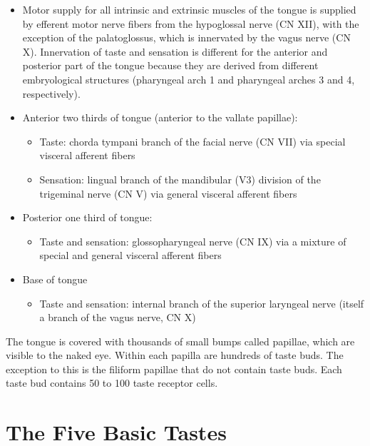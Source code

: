 \documentclass[]{book}
\providecommand{\tightlist}{%
  \setlength{\itemsep}{0pt}\setlength{\parskip}{0pt}}
\begin{document}
\begin{itemize}
\item
  Motor supply for all intrinsic and extrinsic muscles of the tongue is supplied by efferent motor nerve fibers from the hypoglossal nerve (CN XII), with the exception of the palatoglossus, which is innervated by the vagus nerve (CN X).
  Innervation of taste and sensation is different for the anterior and posterior part of the tongue because they are derived from different embryological structures (pharyngeal arch 1 and pharyngeal arches 3 and 4, respectively).
\item
  Anterior two thirds of tongue (anterior to the vallate papillae):

  \begin{itemize}
  \tightlist
  \item
    Taste: chorda tympani branch of the facial nerve (CN VII) via special visceral afferent fibers
  \item
    Sensation: lingual branch of the mandibular (V3) division of the trigeminal nerve (CN V) via general visceral afferent fibers
  \end{itemize}
\item
  Posterior one third of tongue:

  \begin{itemize}
  \tightlist
  \item
    Taste and sensation: glossopharyngeal nerve (CN IX) via a mixture of special and general visceral afferent fibers
  \end{itemize}
\item
  Base of tongue

  \begin{itemize}
  \tightlist
  \item
    Taste and sensation: internal branch of the superior laryngeal nerve (itself a branch of the vagus nerve, CN X)
  \end{itemize}
\end{itemize}

The tongue is covered with thousands of small bumps called papillae, which are visible to the naked eye. Within each papilla are hundreds of taste buds. The exception to this is the filiform papillae that do not contain taste buds. Each taste bud contains 50 to 100 taste receptor cells.

\hypertarget{the-five-basic-tastes}{%
\section{The Five Basic Tastes}\label{the-five-basic-tastes}}
\end{document}
